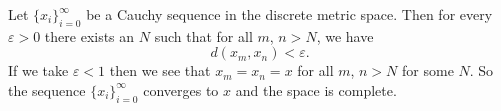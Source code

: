 
\begin{solution}
    Let $\{x_i\}_{i=0}^\infty$ be a Cauchy
    sequence in the discrete metric space. Then
    for every $\varepsilon>0$ there exists an $N$
    such that for all $m$, $n>N$, we have
    $$d(x_m,x_n)<\varepsilon.$$
    If we take $\varepsilon<1$ then we see that
    $x_m=x_n=x$ for all $m$, $n>N$ for some $N$.
    So the sequence $\{x_i\}_{i=0}^\infty$
    converges to $x$ and the space is
    complete.
\end{solution}